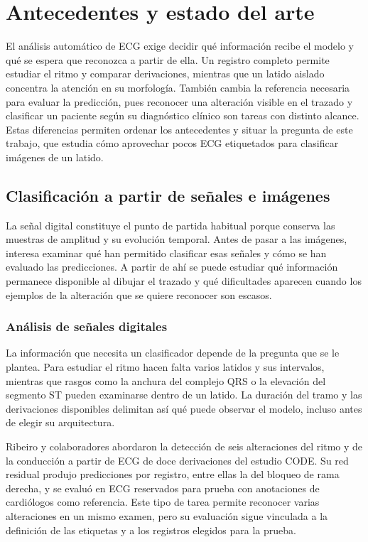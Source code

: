 \chapter{Antecedentes y estado del arte}

\label{chap:relacionados}

El análisis automático de ECG exige decidir qué información recibe el modelo y qué se espera que reconozca a partir de ella. Un registro completo permite estudiar el ritmo y comparar derivaciones, mientras que un latido aislado concentra la atención en su morfología. También cambia la referencia necesaria para evaluar la predicción, pues reconocer una alteración visible en el trazado y clasificar un paciente según su diagnóstico clínico son tareas con distinto alcance. Estas diferencias permiten ordenar los antecedentes y situar la pregunta de este trabajo, que estudia cómo aprovechar pocos ECG etiquetados para clasificar imágenes de un latido.

\section{Clasificación a partir de señales e imágenes}

\label{sec:antecedentes_imagen}

La señal digital constituye el punto de partida habitual porque conserva las muestras de amplitud y su evolución temporal. Antes de pasar a las imágenes, interesa examinar qué han permitido clasificar esas señales y cómo se han evaluado las predicciones. A partir de ahí se puede estudiar qué información permanece disponible al dibujar el trazado y qué dificultades aparecen cuando los ejemplos de la alteración que se quiere reconocer son escasos.

\subsection{Análisis de señales digitales}

La información que necesita un clasificador depende de la pregunta que se le plantea. Para estudiar el ritmo hacen falta varios latidos y sus intervalos, mientras que rasgos como la anchura del complejo QRS o la elevación del segmento ST pueden examinarse dentro de un latido. La duración del tramo y las derivaciones disponibles delimitan así qué puede observar el modelo, incluso antes de elegir su arquitectura. \cite{kligfield2007}

Ribeiro y colaboradores abordaron la detección de seis alteraciones del ritmo y de la conducción a partir de ECG de doce derivaciones del estudio CODE. Su red residual produjo predicciones por registro, entre ellas la del bloqueo de rama derecha, y se evaluó en ECG reservados para prueba con anotaciones de cardiólogos como referencia. Este tipo de tarea permite reconocer varias alteraciones en un mismo examen, pero su evaluación sigue vinculada a la definición de las etiquetas y a los registros elegidos para la prueba. \cite{ribeiro2020}

